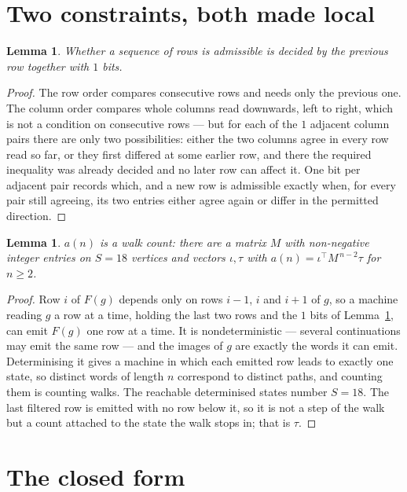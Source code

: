 \documentclass[11pt,a4paper]{article}
\theoremstyle{plain}
\newtheorem{lemma}[theorem]{Lemma}
\theoremstyle{definition}
\begin{document}
\section{Two constraints, both made local}

\begin{lemma}\label{lem:local}
Whether a sequence of rows is admissible is decided by the previous row together with
$1$ bits.
\end{lemma}

\begin{proof}
The row order compares consecutive rows and needs only the previous one. The column order
compares whole columns read downwards, left to right, which is not a condition on consecutive
rows --- but for each of the $1$ adjacent column pairs there are only two possibilities:
either the two columns agree in every row read so far, or they first differed at some earlier
row, and there the required inequality was already decided and no later row can affect it. One
bit per adjacent pair records which, and a new row is admissible exactly when, for every pair
still agreeing, its two entries either agree again or differ in the permitted direction.
\end{proof}

\begin{lemma}\label{lem:det}
$a(n)$ is a walk count: there are a matrix $M$ with non-negative integer entries on $S=18$
vertices and vectors $\iota,\tau$ with $a(n)=\iota^{\!\top}M^{\,n-2}\tau$ for $n\ge2$.
\end{lemma}

\begin{proof}
Row $i$ of $F(g)$ depends only on rows $i-1$, $i$ and $i+1$ of $g$, so a machine reading $g$ a
row at a time, holding the last two rows and the $1$ bits of Lemma~\ref{lem:local}, can
emit $F(g)$ one row at a time. It is nondeterministic --- several continuations may emit the
same row --- and the images of $g$ are exactly the words it can emit. Determinising it gives a
machine in which each emitted row leads to exactly one state, so distinct words of length $n$
correspond to distinct paths, and counting them is counting walks. The reachable determinised
states number $S=18$. The last filtered row is emitted with no row below it, so it is not a
step of the walk but a count attached to the state the walk stops in; that is $\tau$.
\end{proof}

\section{The closed form}
\end{document}
